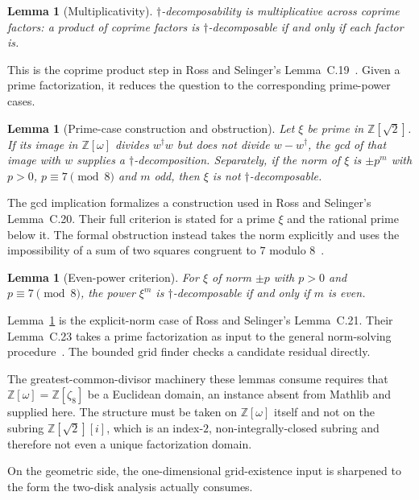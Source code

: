 \documentclass[aps,pra,reprint,nofootinbib,superscriptaddress]{revtex4-2}
\theoremstyle{plain}
\newtheorem{lemma}[theorem]{Lemma}
\theoremstyle{definition}
\begin{document}
\begin{lemma}[Multiplicativity]
\label{lem:c19}
$\dagger$-decomposability is multiplicative across coprime factors: a product of
coprime factors is $\dagger$-decomposable if and only if each factor is.
\end{lemma}

This is the coprime product step in Ross and Selinger's
Lemma~C.19~\cite{RossSelinger2016}. Given a prime factorization, it reduces the
question to the corresponding prime-power cases.

\begin{lemma}[Prime-case construction and obstruction]
\label{lem:c20}
Let $\xi$ be prime in $\mathbb Z[\sqrt 2]$. If its image in
$\mathbb Z[\omega]$ divides $w^{\dagger}w$ but does not divide
$w-w^{\dagger}$, the gcd of that image with $w$ supplies a
$\dagger$-decomposition. Separately, if the norm of $\xi$ is
$\pm p^m$ with $p>0$, $p\equiv 7\pmod 8$ and $m$ odd, then
$\xi$ is not $\dagger$-decomposable.
\end{lemma}

The gcd implication formalizes a construction used in Ross and
Selinger's Lemma~C.20. Their full criterion is stated for a prime
$\xi$ and the rational prime below it. The formal obstruction instead
takes the norm explicitly and uses the impossibility of a sum of
two squares congruent to $7$ modulo $8$~\cite{RossSelinger2016}.

\begin{lemma}[Even-power criterion]
\label{lem:c21}
For $\xi$ of norm $\pm p$ with $p>0$ and $p \equiv 7 \pmod 8$, the power
$\xi^m$ is $\dagger$-decomposable if and only if $m$ is even.
\end{lemma}

Lemma~\ref{lem:c21} is the explicit-norm case of Ross and Selinger's
Lemma~C.21. Their Lemma~C.23 takes a prime factorization as input to the
general norm-solving procedure~\cite{RossSelinger2016}. The bounded grid
finder checks a candidate residual directly.

The greatest-common-divisor machinery these lemmas consume requires that
$\mathbb Z[\omega] = \mathbb Z[\zeta_8]$ be a Euclidean domain, an instance
absent from Mathlib and supplied here. The structure must be taken on
$\mathbb Z[\omega]$ itself and not on the subring $\mathbb Z[\sqrt 2][i]$,
which is an index-$2$, non-integrally-closed subring and therefore not even a
unique factorization domain.

On the geometric side, the one-dimensional grid-existence input is sharpened to
the form the two-disk analysis actually consumes.
\end{document}
